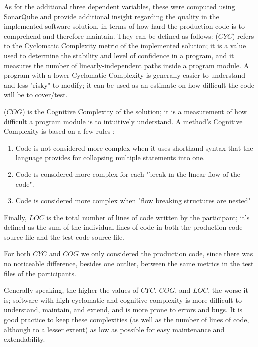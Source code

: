 As for the additional three dependent variables, these were computed using SonarQube and provide additional insight regarding the quality in the implemented software solution, in terms of how hard the production code is to comprehend and therefore maintain. They can be defined as follows:
(\textbf{$CYC$}) refers to the Cyclomatic Complexity metric of the implemented solution; it is a value used to determine the stability and level of confidence in a program, and it measures the number of linearly-independent paths inside a program module. A program with a lower Cyclomatic Complexity is generally easier to understand and less "risky" to modify; it can be used as an estimate on how difficult the code will be to cover/test.

(\textbf{$COG$}) is the Cognitive Complexity of the solution; it is a measurement of how difficult a program module is to intuitively understand. A method's Cognitive Complexity is based on a few rules \cite{CognitiveComplexity}:
\begin{enumerate}
    \item Code is not considered more complex when it uses shorthand syntax that the language provides for collapsing multiple statements into one.
    \item Code is considered more complex for each "break in the linear flow of the code".
    \item Code is considered more complex when "flow breaking structures are nested"
\end{enumerate}

Finally, $LOC$ is the total number of lines of code written by the participant; it's defined as the sum of the individual lines of code in both the production code source file and the test code source file.

For both $CYC$ and $COG$ we only considered the production code, since there was no noticeable difference, besides one outlier, between the same metrics in the test files of the participants.

Generally speaking, the higher the values of $CYC$, $COG$, and $LOC$, the worse it is; software with high cyclomatic and cognitive complexity is more difficult to understand, maintain, and extend, and is more prone to errors and bugs. It is good practice to keep these complexities (as well as the number of lines of code, although to a lesser extent) as low as possible for easy maintenance and extendability.






